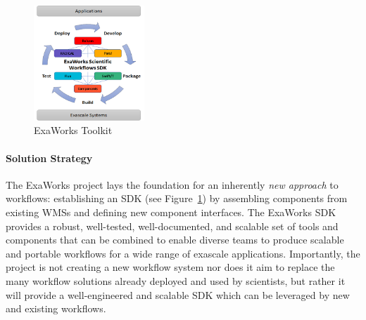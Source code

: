 \begin{figure}
\begin{center}
    \includegraphics[width=0.37\textwidth]{projects/2.3.5-Ecosystem/2.3.5.10-ExaWorks/exaworks-circle.png}
  \end{center}
  \vspace{-0.25in}
  \caption{ExaWorks Toolkit\label{fig:arch}}
\end{figure} 

\paragraph{Solution Strategy}
The ExaWorks project lays the foundation for an inherently
\textit{new approach} to workflows: establishing an SDK (see
Figure~\ref{fig:arch}) by assembling components from existing WMSs
and defining new component interfaces. 
The ExaWorks SDK provides a robust, well-tested, well-documented,
and scalable set of tools and components that can be combined to enable diverse teams to
produce scalable and portable workflows for a wide range of exascale
applications. Importantly, the project is not creating a new workflow system
nor does it aim to replace the many workflow solutions already deployed
and used by scientists, but rather it will provide a well-engineered and
scalable SDK which can be leveraged by new and existing workflows.





